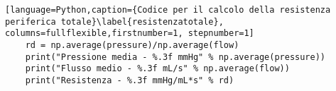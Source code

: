 \begin{lstlisting}[language=Python,caption={Codice per il calcolo della resistenza periferica totale}\label{resistenzatotale}, columns=fullflexible,firstnumber=1, stepnumber=1]
    rd = np.average(pressure)/np.average(flow)
    print("Pressione media - %.3f mmHg" % np.average(pressure))
    print("Flusso medio - %.3f mL/s" % np.average(flow))
    print("Resistenza - %.3f mmHg/mL*s" % rd)
\end{lstlisting}